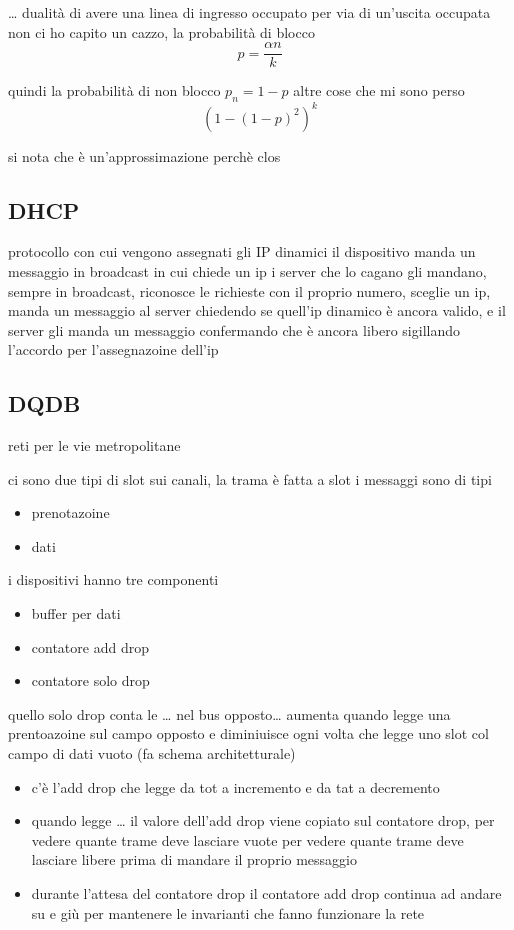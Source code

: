 \documentclass[11pt]{article}
\begin{document}
\ldots{} dualità di avere una linea di ingresso occupato per via di un'uscita occupata
non ci ho capito un cazzo, la probabilità di blocco
\[ p = \frac{\alpha n}{k} \]

quindi la probabilità di non blocco \(p_n = 1 - p\)
altre cose che mi sono perso
\[ {(1 - {(1 - p)}^2)}^k \]

si nota che è un'approssimazione perchè clos

\subsection{DHCP}
\label{sec:org116f53f}
protocollo con cui vengono assegnati gli IP dinamici
il dispositivo manda un messaggio in broadcast in cui chiede un ip
i server che lo cagano gli mandano, sempre in broadcast, riconosce le richieste con il proprio numero, sceglie un ip, manda un messaggio al server chiedendo se quell'ip dinamico è ancora valido, e il server gli manda un messaggio confermando che è ancora libero sigillando l'accordo per l'assegnazoine dell'ip

\subsection{DQDB}
\label{sec:orgce3c90d}
reti per le vie metropolitane

ci sono due tipi di slot sui canali, la trama è fatta a slot
i messaggi sono di tipi
\begin{itemize}
\item prenotazoine
\item dati
\end{itemize}

i dispositivi hanno tre componenti
\begin{itemize}
\item buffer per dati
\item contatore add drop
\item contatore solo drop
\end{itemize}

quello solo drop conta le \ldots{} nel bus opposto\ldots{} aumenta quando legge una prentoazoine sul campo opposto e diminiuisce ogni volta che legge uno slot col campo di dati vuoto
(fa schema architetturale)

\begin{itemize}
\item c'è l'add drop che legge da tot a incremento e da tat a decremento
\item quando legge \ldots{} il valore dell'add drop viene copiato sul contatore drop, per vedere quante trame deve lasciare vuote per vedere quante trame deve lasciare libere prima di mandare il proprio messaggio
\item durante l'attesa del contatore drop il contatore add drop continua ad andare su e giù per mantenere le invarianti che fanno funzionare la rete
\end{itemize}
\end{document}
